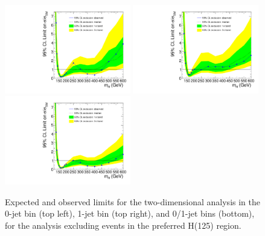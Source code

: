 \begin{figure}[hbt!]
\begin{center}
  \includegraphics[width=0.49\textwidth]{figures/limits8TeV_ofshape0_HCP_2D_NoH125.pdf}
  \includegraphics[width=0.49\textwidth]{figures/limits8TeV_ofshape1_HCP_2D_NoH125.pdf}
  \includegraphics[width=0.49\textwidth]{figures/limits8TeV_ofshape_HCP_2D_NoH125.pdf}
\caption{\label{fig:limits8TeV_ofshapeN_HCP_2D_NoH125}\protect Expected and observed limits for the two-dimensional 
analysis in the 0-jet bin (top left), 1-jet bin (top right), and 0/1-jet bins (bottom), for 
the analysis excluding events in the preferred H(125) region.}
\end{center}
\end{figure}

